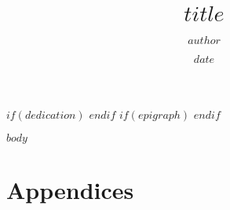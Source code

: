 \documentclass{ucetd}
\title{$title$}
\author{$author$}
\date{$date$}
\begin{document}
\maketitle

\makecopyright
$if(dedication)$
\makededication
$endif$
$if(epigraph)$
\makeepigraph
$endif$


\tableofcontents
\listoffigures
\listoftables



\mainmatter
$body$


\chapter{Appendices}
\end{document}
